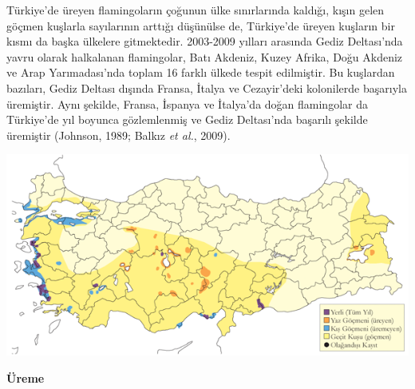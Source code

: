 \documentclass[
  a4paper,
  DIV=11,
  numbers=noendperiod]{scrreprt}
\begin{document}
Türkiye'de üreyen flamingoların çoğunun ülke sınırlarında kaldığı, kışın
gelen göçmen kuşlarla sayılarının arttığı düşünülse de, Türkiye'de
üreyen kuşların bir kısmı da başka ülkelere gitmektedir. 2003-2009
yılları arasında Gediz Deltası'nda yavru olarak halkalanan flamingolar,
Batı Akdeniz, Kuzey Afrika, Doğu Akdeniz ve Arap Yarımadası'nda toplam
16 farklı ülkede tespit edilmiştir. Bu kuşlardan bazıları, Gediz Deltası
dışında Fransa, İtalya ve Cezayir'deki kolonilerde başarıyla üremiştir.
Aynı şekilde, Fransa, İspanya ve İtalya'da doğan flamingolar da
Türkiye'de yıl boyunca gözlemlenmiş ve Gediz Deltası'nda başarılı
şekilde üremiştir (Johnson, 1989; Balkız \emph{et al.}, 2009).

\includegraphics{images/harita_Page_056.png}

\textbf{Üreme}
\end{document}
